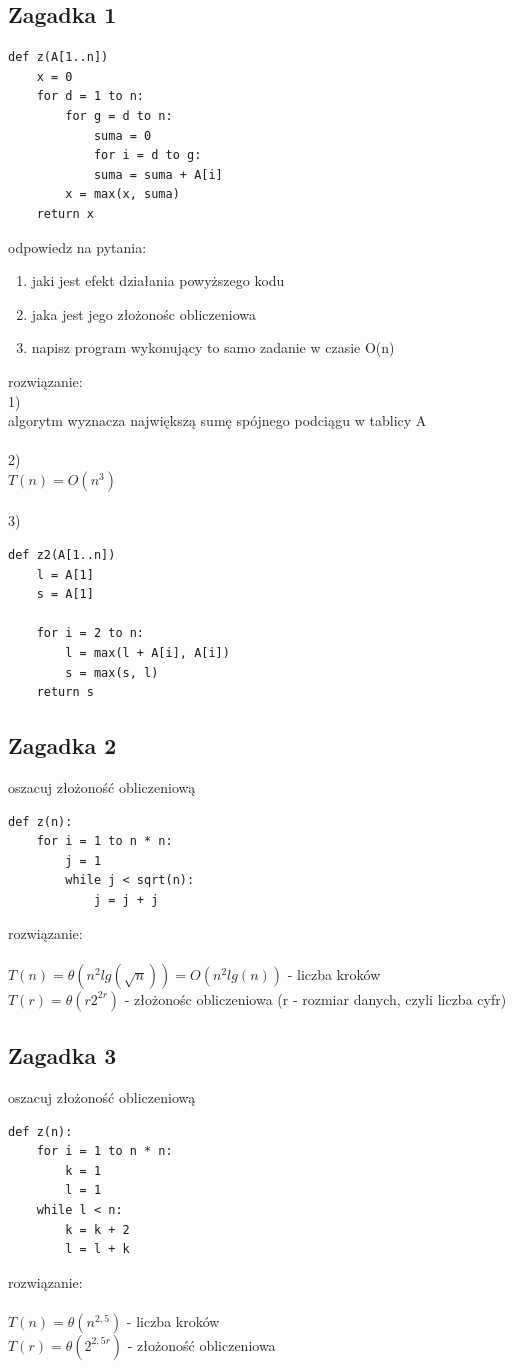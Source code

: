 \documentclass{article}
\begin{document}
\subsection*{Zagadka 1}
\begin{lstlisting}
def z(A[1..n])
	x = 0
	for d = 1 to n:
		for g = d to n:
			suma = 0
			for i = d to g:
			suma = suma + A[i]
		x = max(x, suma)
	return x

\end{lstlisting}
odpowiedz na pytania:
\begin{enumerate}
	\item jaki jest efekt działania powyższego kodu
	\item jaka jest jego złożonośc obliczeniowa
	\item napisz program wykonujący to samo zadanie w czasie O(n)	
\end{enumerate}
rozwiązanie:\\
1)\\
algorytm wyznacza największą sumę spójnego podciągu w tablicy A \\\\
2)\\
$T(n) = O(n^3)$ \\\\
3)
\begin{lstlisting}
def z2(A[1..n])
	l = A[1]
	s = A[1]
	
	for i = 2 to n:
		l = max(l + A[i], A[i])
		s = max(s, l)
	return s

\end{lstlisting}

\subsection*{Zagadka 2}
oszacuj złożoność obliczeniową
\begin{lstlisting}
def z(n):
	for i = 1 to n * n:
		j = 1
		while j < sqrt(n):
			j = j + j
\end{lstlisting}
rozwiązanie: \\\\
$T(n) = \theta(n^2lg(\sqrt n)) = O(n^2lg(n))$ - liczba kroków \\
$T(r) = \theta(r2^{2r})$ - złożonośc obliczeniowa (r - rozmiar danych, czyli liczba cyfr)

\subsection*{Zagadka 3}
oszacuj złożoność obliczeniową
\begin{lstlisting}
def z(n):
	for i = 1 to n * n:
		k = 1
		l = 1
	while l < n:
		k = k + 2
		l = l + k
\end{lstlisting}
rozwiązanie: \\\\
$T(n) = \theta(n^{2,5})$ - liczba kroków \\
$T(r) = \theta(2^{2,5r})$ - złożoność obliczeniowa
\end{document}
